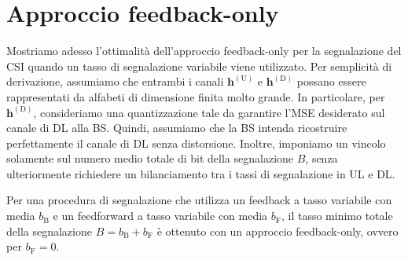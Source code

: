 \section{Approccio feedback-only}
\label{sec:feedback-only}

Mostriamo adesso l'ottimalità dell'approccio feedback-only per la segnalazione
del CSI quando un tasso di segnalazione variabile viene utilizzato. Per
semplicità di derivazione, assumiamo che entrambi i canali
\(\bm{h}^\mathrm{(U)}\) e \(\bm{h}^\mathrm{(D)}\) possano essere rappresentati
da alfabeti di dimensione finita molto grande. In particolare, per
\(\bm{h}^\mathrm{(D)}\), consideriamo una quantizzazione tale da garantire
l'MSE desiderato sul canale di DL alla BS. Quindi, assumiamo che la BS intenda
ricostruire perfettamente il canale di DL senza distorsione. Inoltre, imponiamo
un vincolo solamente sul numero medio totale di bit della segnalazione \(B\),
senza ulteriormente richiedere un bilanciamento tra i tassi di segnalazione in
UL e DL.

\begin{thm}
    \label{thm:feedback-only}

    Per una procedura di segnalazione che utilizza un feedback a tasso
    variabile con media \(b_\mathrm{B}\) e un feedforward a tasso variabile con
    media \(b_\mathrm{F}\), il tasso minimo totale della segnalazione \(B =
    b_\mathrm{B} + b_\mathrm{F}\) è ottenuto con un approccio feedback-only,
    ovvero per \(b_\mathrm{F} = 0\).
\end{thm}

